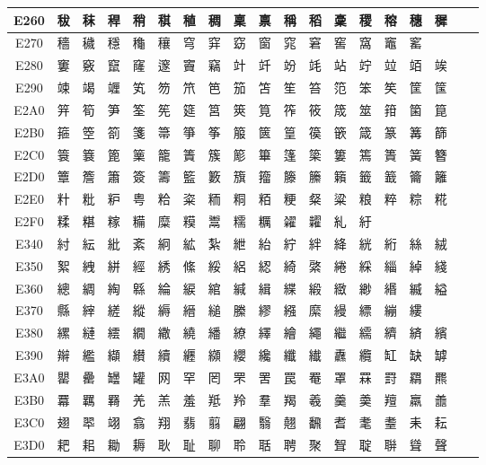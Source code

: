 \begin{table}[H]
\begin{tabular}{|Sc|*{16}{>{\centering\arraybackslash}p{1em}|}>{\centering\arraybackslash}p{2.5em}|}
E260 & 秡 & 秣 & 稈 & 稍 & 稘 & 稙 & 稠 & 稟 & 禀 & 稱 & 稻 & 稾 & 稷 & 穃 & 穗 & 穉 \\ \hline
E270 & 穡 & 穢 & 穩 & 龝 & 穰 & 穹 & 穽 & 窈 & 窗 & 窕 & 窘 & 窖 & 窩 & 竈 & 窰 & \\ \hline
E280 & 窶 & 竅 & 竄 & 窿 & 邃 & 竇 & 竊 & 竍 & 竏 & 竕 & 竓 & 站 & 竚 & 竝 & 竡 & 竢 \\ \hline
E290 & 竦 & 竭 & 竰 & 笂 & 笏 & 笊 & 笆 & 笳 & 笘 & 笙 & 笞 & 笵 & 笨 & 笶 & 筐 & 筺 \\ \hline
E2A0 & 笄 & 筍 & 笋 & 筌 & 筅 & 筵 & 筥 & 筴 & 筧 & 筰 & 筱 & 筬 & 筮 & 箝 & 箘 & 箟 \\ \hline
E2B0 & 箍 & 箜 & 箚 & 箋 & 箒 & 箏 & 筝 & 箙 & 篋 & 篁 & 篌 & 篏 & 箴 & 篆 & 篝 & 篩 \\ \hline
E2C0 & 簑 & 簔 & 篦 & 篥 & 籠 & 簀 & 簇 & 簓 & 篳 & 篷 & 簗 & 簍 & 篶 & 簣 & 簧 & 簪 \\ \hline
E2D0 & 簟 & 簷 & 簫 & 簽 & 籌 & 籃 & 籔 & 籏 & 籀 & 籐 & 籘 & 籟 & 籤 & 籖 & 籥 & 籬 \\ \hline
E2E0 & 籵 & 粃 & 粐 & 粤 & 粭 & 粢 & 粫 & 粡 & 粨 & 粳 & 粲 & 粱 & 粮 & 粹 & 粽 & 糀 \\ \hline
E2F0 & 糅 & 糂 & 糘 & 糒 & 糜 & 糢 & 鬻 & 糯 & 糲 & 糴 & 糶 & 糺 & 紆 & & & \\ \hline
E340 & 紂 & 紜 & 紕 & 紊 & 絅 & 絋 & 紮 & 紲 & 紿 & 紵 & 絆 & 絳 & 絖 & 絎 & 絲 & 絨 \\ \hline
E350 & 絮 & 絏 & 絣 & 經 & 綉 & 絛 & 綏 & 絽 & 綛 & 綺 & 綮 & 綣 & 綵 & 緇 & 綽 & 綫 \\ \hline
E360 & 總 & 綢 & 綯 & 緜 & 綸 & 綟 & 綰 & 緘 & 緝 & 緤 & 緞 & 緻 & 緲 & 緡 & 縅 & 縊 \\ \hline
E370 & 縣 & 縡 & 縒 & 縱 & 縟 & 縉 & 縋 & 縢 & 繆 & 繦 & 縻 & 縵 & 縹 & 繃 & 縷 & \\ \hline
E380 & 縲 & 縺 & 繧 & 繝 & 繖 & 繞 & 繙 & 繚 & 繹 & 繪 & 繩 & 繼 & 繻 & 纃 & 緕 & 繽 \\ \hline
E390 & 辮 & 繿 & 纈 & 纉 & 續 & 纒 & 纐 & 纓 & 纔 & 纖 & 纎 & 纛 & 纜 & 缸 & 缺 & 罅 \\ \hline
E3A0 & 罌 & 罍 & 罎 & 罐 & 网 & 罕 & 罔 & 罘 & 罟 & 罠 & 罨 & 罩 & 罧 & 罸 & 羂 & 羆 \\ \hline
E3B0 & 羃 & 羈 & 羇 & 羌 & 羔 & 羞 & 羝 & 羚 & 羣 & 羯 & 羲 & 羹 & 羮 & 羶 & 羸 & 譱 \\ \hline
E3C0 & 翅 & 翆 & 翊 & 翕 & 翔 & 翡 & 翦 & 翩 & 翳 & 翹 & 飜 & 耆 & 耄 & 耋 & 耒 & 耘 \\ \hline
E3D0 & 耙 & 耜 & 耡 & 耨 & 耿 & 耻 & 聊 & 聆 & 聒 & 聘 & 聚 & 聟 & 聢 & 聨 & 聳 & 聲 \\ \hline

\end{tabular}
\end{table}
